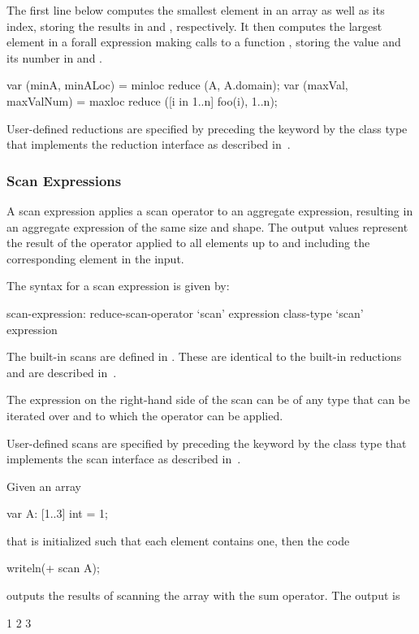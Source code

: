 \begin{example}
The first line below computes the smallest element in an array
 as well as its index, storing the results in  and
, respectively.  It then computes the largest element in
a forall expression making calls to a function , storing
the value and its number in  and .
\begin{chapel}
var (minA, minALoc) = minloc reduce (A, A.domain); 
var (maxVal, maxValNum) = maxloc reduce ([i in 1..n] foo(i), 1..n);
\end{chapel}
\end{example}

User-defined reductions are specified by preceding the
keyword  by the class type that implements the reduction
interface as described in~.

\subsubsection{Scan Expressions}
\label{scan}

A scan expression applies a scan operator to an aggregate expression,
resulting in an aggregate expression of the same size and shape.  The
output values represent the result of the operator applied to all
elements up to and including the corresponding element in the input.

The syntax for a scan expression is given by:
\begin{syntax}
scan-expression:
  reduce-scan-operator `scan' expression
  class-type `scan' expression
\end{syntax}

The built-in scans are defined in .  These
are identical to the built-in reductions and are described
in~.

The expression on the right-hand side of the scan can be of any type
that can be iterated over and to which the operator can be applied.

User-defined scans are specified by preceding the keyword 
by the class type that implements the scan interface as described
in~.

\begin{example}
Given an array
\begin{chapel}
var A: [1..3] int = 1;
\end{chapel}
that is initialized such that each element contains one, then the code
\begin{chapel}
writeln(+ scan A);
\end{chapel}
outputs the results of scanning the array with the sum operator.  The
output is
\begin{chapel}
1 2 3
\end{chapel}
\end{example}

